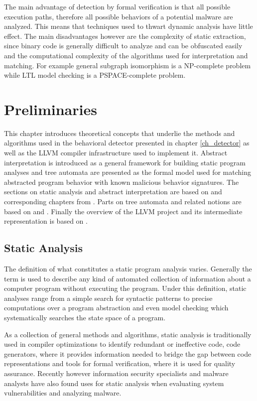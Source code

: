 The main advantage of detection by formal verification is that all possible execution paths, therefore all possible behaviors of a potential malware are analyzed. This means that techniques used to thwart dynamic analysis have little effect. The main disadvantages however are the complexity of static extraction, since binary code is generally difficult to analyze and can be obfuscated easily and the computational complexity of the algorithms used for interpretation and matching. For example general subgraph isomorphism is a NP-complete\cite{Garey79} problem while LTL model checking is a PSPACE-complete problem\cite{Sistla85}.

\chapter{Preliminaries}
\label{ch_prelim}
This chapter introduces theoretical concepts that underlie the methods and algorithms used in the behavioral detector presented in chapter \ref{ch_detector} as well as the {LLVM} compiler infrastructure used to implement it. Abstract interpretation is introduced as a general framework for building static program analyses and tree automata are presented as the formal model used for matching abstracted program behavior with known malicious behavior signatures. The sections on static analysis and abstract interpretation are based on \cite{FAV_Slides16} and corresponding chapters from \cite{Nielson05}. Parts on tree automata and related notions are based on \cite{tata07} and \cite{Babic11}. Finally the overview of the {LLVM} project and its intermediate representation is based on \cite{LLVM14}.

\section{Static Analysis}
The definition of what constitutes a static program analysis varies. Generally the term is used to describe any kind of automated collection of information about a computer program without executing the program. Under this definition, static analyses range from a simple search for syntactic patterns to precise computations over a program abstraction and even model checking which systematically searches the state space of a program.

As a collection of general methods and algorithms, static analysis is traditionally used in compiler optimizations to identify redundant or ineffective code, code generators, where it provides information needed to bridge the gap between code representations and tools for formal verification, where it is used for quality assurance. Recently however information security specialists and malware analysts have also found uses for static analysis when evaluating system vulnerabilities and analyzing malware.

